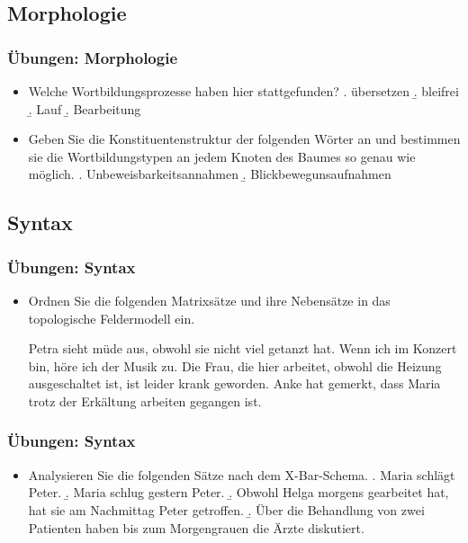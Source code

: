 \subsection{Morphologie}

\begin{frame}
\frametitle{Übungen: Morphologie}

\begin{itemize}
	\item Welche Wortbildungsprozesse haben hier stattgefunden?
	\a. übersetzen
	\b. bleifrei
	\b. Lauf
	\b. Bearbeitung

	\item Geben Sie die Konstituentenstruktur der folgenden Wörter an und bestimmen sie die Wortbildungstypen an jedem Knoten des Baumes so genau wie möglich.
	\a. Unbeweisbarkeitsannahmen
	\b. Blickbewegunsaufnahmen
	
\end{itemize}

\end{frame}


\subsection{Syntax}

\begin{frame}
\frametitle{Übungen: Syntax}

\begin{itemize}
	\item Ordnen Sie die folgenden Matrixsätze und ihre Nebensätze in das topologische Feldermodell ein.
	
	\eal
	\ex Petra sieht müde aus, obwohl sie nicht viel getanzt hat.
	\ex Wenn ich im Konzert bin, höre ich der Musik zu.
	\ex Die Frau, die hier arbeitet, obwohl die Heizung ausgeschaltet ist, ist leider krank geworden.
	\ex Anke hat gemerkt, dass Maria trotz der Erkältung arbeiten gegangen ist.
	\zl
	
\end{itemize}

\end{frame}


\begin{frame}
\frametitle{Übungen: Syntax}

\begin{itemize}
	\item Analysieren Sie die folgenden Sätze nach dem X-Bar-Schema.
	\a. Maria schlägt Peter.
	\b. Maria schlug gestern Peter.
	\b. Obwohl Helga morgens gearbeitet hat, hat sie am Nachmittag Peter getroffen.
	\b. Über die Behandlung von zwei Patienten haben bis zum Morgengrauen die Ärzte diskutiert.
	
\end{itemize}

\end{frame}


